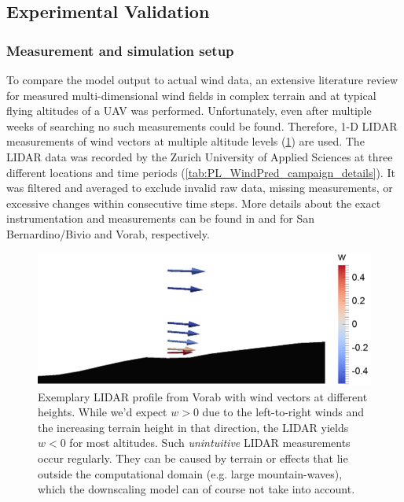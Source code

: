 \documentclass[twocolumn,letterpaper]{IEEEAerospaceCLS}
\begin{document}
\subsection{Experimental Validation}
\label{sec:PL_WindPred_PrelResults_Experimental}

\subsubsection{Measurement and simulation setup}
\label{sec:PL_WindPred_meas_setup}

To compare the model output to actual wind data, an extensive literature review for measured multi-dimensional wind fields in complex terrain and at typical flying altitudes of a \ac{UAV} was performed. Unfortunately, even after multiple weeks of searching no such measurements could be found. Therefore, 1-D LIDAR measurements of wind vectors at multiple altitude levels (\cref{fig:PL_WindPred_vorab_lidar}) are used. The LIDAR data was recorded by the Zurich University of Applied Sciences at three different locations and time periods (\cref{tab:PL_WindPred_campaign_details}). It was filtered and averaged to exclude invalid raw data, missing measurements, or excessive changes within consecutive time steps. More details about the exact instrumentation and measurements can be found in \cite{Kuratle2015} and \cite{Hasler2016} for San Bernardino/Bivio and Vorab, respectively. 

\begin{figure}[htbp]
\centering
\includegraphics[width=\columnwidth]{images/WindPred/Results/vorab_331_lidar.png}
\caption[LIDAR profile Vorab]{Exemplary LIDAR profile from Vorab with wind vectors at different heights. While we'd expect $w>0$ due to the left-to-right winds and the increasing terrain height in that direction, the LIDAR yields $w<0$ for most altitudes. Such \emph{unintuitive} LIDAR measurements occur regularly. They can be caused by terrain or effects that lie outside the computational domain (e.g. large mountain-waves), which the downscaling model can of course not take into account.}
\label{fig:PL_WindPred_vorab_lidar}
\end{figure}
\end{document}

